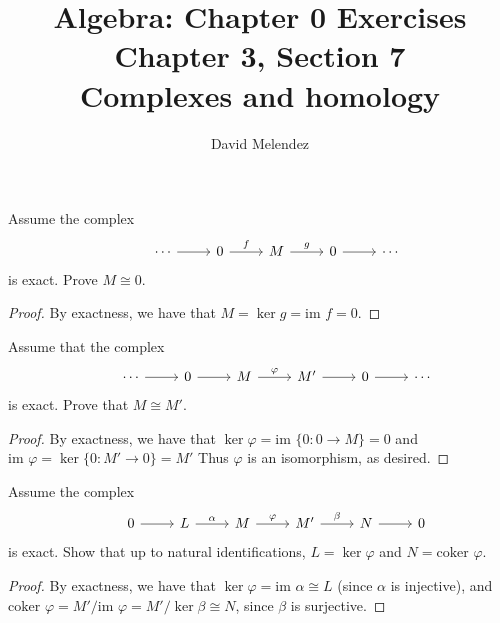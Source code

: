 \documentclass[12pt]{article}
\newenvironment{problem}[2][Problem]{\begin{trivlist}
\item[\hskip \labelsep {\bfseries #1}\hskip \labelsep {\bfseries #2.}]}{\end{trivlist}}
\newcommand{\im}{\text{im }}
\newcommand{\coker}{\text{coker }}
\theoremstyle{remark}
\begin{document}
\title{Algebra: Chapter 0 Exercises\\ \large Chapter 3, Section 7\\ 
\large Complexes and homology}
\author{David Melendez}
\maketitle

\begin{problem}{7.1}
  Assume the complex
  \[
  \begin{tikzcd}
    &\cdots \ar[r] &0 \ar[r,"f"] &M \ar[r,"g"] &0 \ar[r] &\cdots
  \end{tikzcd}
  \]
  is exact.
  Prove $M\cong0$.
  \begin{proof}
    By exactness, we have that $M=\ker g=\im f=0$.
  \end{proof}
\end{problem}

\begin{problem}{7.2}
  Assume that the complex
  \[
    \begin{tikzcd}
      &\cdots \ar[r] &0 \ar[r] &M \ar[r,"\varphi"] &M' \ar[r] &0 \ar[r] &\cdots
    \end{tikzcd}
  \]
  is exact.
  Prove that $M\cong M'$.
\end{problem}
\begin{proof}
  By exactness, we have that $\ker\varphi=\im\{0:0\to M\} = 0$ and $\im\varphi=\ker\{0:M'\to 0\}=M'$
  Thus $\varphi$ is an isomorphism, as desired.
\end{proof}

\begin{problem}{7.3}
  Assume the complex
  \[
    \begin{tikzcd}
      &0\ar[r] &L \ar[r,"\alpha"] &M \ar[r,"\varphi"] &M' \ar[r,"\beta"] &N \ar[r] &0
    \end{tikzcd}
  \]
  is exact.
  Show that up to natural identifications, $L=\ker\varphi$ and $N=\coker\varphi$.
\end{problem}
\begin{proof}
  By exactness, we have that $\ker\varphi=\im\alpha\cong L$ (since $\alpha$ is injective),
  and $\coker\varphi=M'/\im\varphi=M'/\ker\beta\cong N$, since $\beta$ is surjective.
\end{proof}
\end{document}
